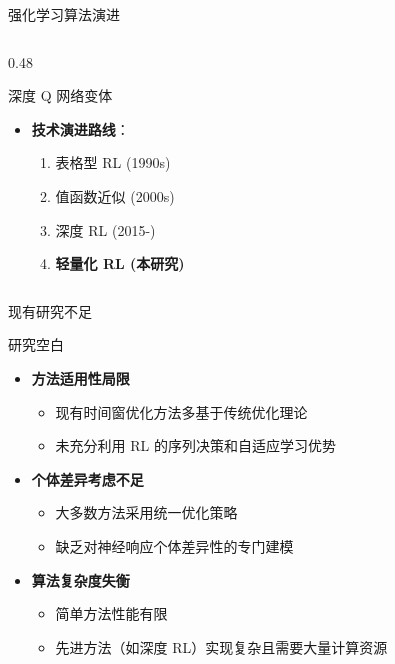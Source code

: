 \begin{frame}{强化学习算法演进}
\begin{columns}[T]
\begin{column}{0.48\textwidth}
\begin{exampleblock}{\normalsize 深度 Q 网络变体}
                \begin{itemize}
                    \item \textbf{技术演进路线}：
                    \begin{enumerate}
                        \item 表格型 RL (1990s)
                        \item 值函数近似 (2000s)
                        \item 深度 RL (2015-)
                        \item \textcolor{primaryblue}{\textbf{轻量化 RL (本研究)}}
                    \end{enumerate}
                \end{itemize}
            \end{exampleblock}
        \end{column}
    \end{columns}
\end{frame}

\begin{frame}{现有研究不足}
    \begin{alertblock}{\normalsize 研究空白}
        \begin{itemize}
            \item[\textcolor{accentred}{\textbullet}] \textbf{方法适用性局限}
            \begin{itemize}
                \item 现有时间窗优化方法多基于传统优化理论
                \item 未充分利用 RL 的序列决策和自适应学习优势
            \end{itemize}

            \vspace{0.5em}
            \item[\textcolor{accentred}{\textbullet}] \textbf{个体差异考虑不足}
            \begin{itemize}
                \item 大多数方法采用统一优化策略
                \item 缺乏对神经响应个体差异性的专门建模
            \end{itemize}

            \vspace{0.5em}
            \item[\textcolor{accentred}{\textbullet}] \textbf{算法复杂度失衡}
            \begin{itemize}
                \item 简单方法性能有限
                \item 先进方法（如深度 RL）实现复杂且需要大量计算资源
            \end{itemize}
        \end{itemize}
    \end{alertblock}
\end{frame}

